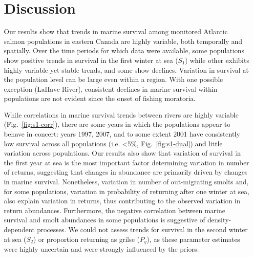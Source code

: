 \documentclass[12pt]{article}
\newcommand{\So}{$S_{1}$\xspace}
\newcommand{\St}{$S_{2}$\xspace}
\newcommand{\Pg}{$P_g$\xspace}
\begin{document}
\section*{Discussion} 



Our results show that trends in marine survival among monitored Atlantic salmon
populations in eastern Canada are highly variable, both temporally and
spatially. Over the time periods for which data were available, some
populations show positive trends in survival in the first winter at sea (\So)
while other exhibits highly variable yet stable trends, and some show declines.
Variation in survival at the population level can be large even within a
region. With one possible exception (LaHave River), consistent declines in
marine survival within populations are not evident since the onset of fishing
moratoria.

While correlations in marine survival trends between rivers are highly 
variable (Fig.~\ref{fig:s1-corr}),
there are some years in which the populations appear to behave in concert:
years 1997, 2007, and to some extent 2001 have consistently low survival across all populations 
(i.e. <5\%, Fig.~\ref{fig:s1-dual}) and little variation across populations.
Our results also show that variation of survival in the first year at sea is the most
important factor determining variation in number of returns, suggesting that changes in abundance are primarily driven by changes in marine survival. 
Nonetheless, variation in number of out-migrating smolts and, for some populations,
variation in probability of returning after one winter at sea, also explain
variation in returns, thus contributing to the observed variation in return abundances.
Furthermore, the negative correlation between marine survival and smolt
abundances in some populations is suggestive of density-dependent processes.
We could not assess trends for survival in the second winter at sea (\St) or
proportion returning as grilse (\Pg), as these parameter estimates were highly
uncertain and were strongly influenced by the priors. 

\end{document}
